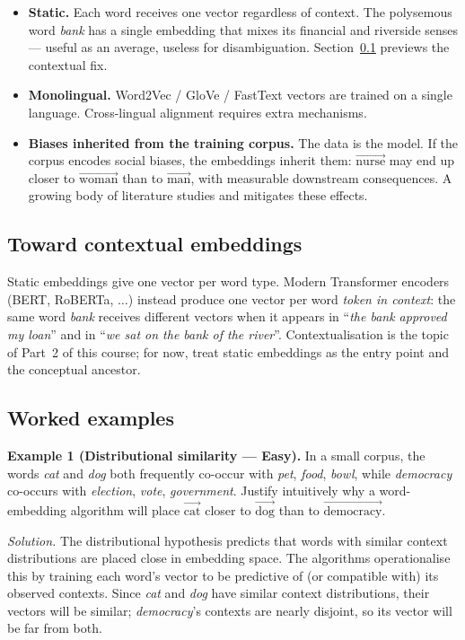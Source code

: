 \begin{itemize}
    \item \textbf{Static.} Each word receives one vector regardless of context. The polysemous word \emph{bank} has a single embedding that mixes its financial and riverside senses --- useful as an average, useless for disambiguation. Section~\ref{sec:contextual-preview} previews the contextual fix.
    \item \textbf{Monolingual.} Word2Vec / GloVe / FastText vectors are trained on a single language. Cross-lingual alignment requires extra mechanisms.
    \item \textbf{Biases inherited from the training corpus.} The data is the model. If the corpus encodes social biases, the embeddings inherit them: $\overrightarrow{\text{nurse}}$ may end up closer to $\overrightarrow{\text{woman}}$ than to $\overrightarrow{\text{man}}$, with measurable downstream consequences. A growing body of literature studies and mitigates these effects.
\end{itemize}

\subsection{Toward contextual embeddings}
\label{sec:contextual-preview}

Static embeddings give one vector per word type. Modern Transformer encoders (BERT, RoBERTa, $\dots$) instead produce one vector per word \emph{token in context}: the same word \emph{bank} receives different vectors when it appears in ``\emph{the bank approved my loan}'' and in ``\emph{we sat on the bank of the river}''. Contextualisation is the topic of Part~2 of this course; for now, treat static embeddings as the entry point and the conceptual ancestor.

\subsection{Worked examples}

\textbf{Example 1 (Distributional similarity --- Easy).}
In a small corpus, the words \emph{cat} and \emph{dog} both frequently co-occur with \emph{pet}, \emph{food}, \emph{bowl}, while \emph{democracy} co-occurs with \emph{election}, \emph{vote}, \emph{government}. Justify intuitively why a word-embedding algorithm will place $\overrightarrow{\text{cat}}$ closer to $\overrightarrow{\text{dog}}$ than to $\overrightarrow{\text{democracy}}$.

\textit{Solution.} The distributional hypothesis predicts that words with similar context distributions are placed close in embedding space. The algorithms operationalise this by training each word's vector to be predictive of (or compatible with) its observed contexts. Since \emph{cat} and \emph{dog} have similar context distributions, their vectors will be similar; \emph{democracy}'s contexts are nearly disjoint, so its vector will be far from both.

